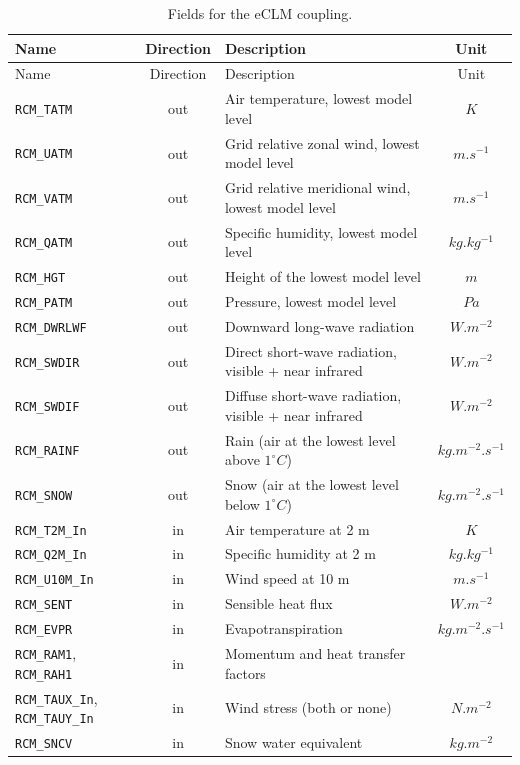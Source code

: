 {\footnotesize
\begin{longtable}{p{4.5cm}|c|p{6.5cm}|c}
\caption{Fields for the eCLM coupling.}
\label{oasis_eclm_field_list}\\
\hline
Name & Direction & Description & Unit\\
\hline
\endfirsthead
\hline
Name & Direction & Description & Unit\\
\hline
\endhead
\verb=RCM_TATM= & out & Air temperature, lowest model level & $K$\\
\verb=RCM_UATM= &
  out &
  Grid relative zonal wind, lowest model level &
  $m.s^{-1}$\\
\verb=RCM_VATM= &
  out &
  Grid relative meridional wind, lowest model level &
  $m.s^{-1}$\\
\verb=RCM_QATM= & out & Specific humidity, lowest model level & $kg.kg^{-1}$\\
\verb=RCM_HGT= & out & Height of the lowest model level & $m$\\
\verb=RCM_PATM= & out & Pressure, lowest model level & $Pa$\\
\verb=RCM_DWRLWF= & out & Downward long-wave radiation & $W.m^{-2}$\\
\verb=RCM_SWDIR= &
  out &
  Direct short-wave radiation, visible + near infrared &
  $W.m^{-2}$\\
\verb=RCM_SWDIF= &
  out &
  Diffuse short-wave radiation, visible + near infrared &
  $W.m^{-2}$\\
\verb=RCM_RAINF= &
  out &
  Rain (air at the lowest level above $1^{\circ}C$) &
  $kg.m^{-2}.s^{-1}$\\
\verb=RCM_SNOW= &
  out &
  Snow (air at the lowest level below $1^{\circ}C$) &
  $kg.m^{-2}.s^{-1}$\\
\verb=RCM_T2M_In= & in & Air temperature at 2 m & $K$\\
\verb=RCM_Q2M_In= & in & Specific humidity at 2 m & $kg.kg^{-1}$\\
\verb=RCM_U10M_In= & in & Wind speed at 10 m & $m.s^{-1}$\\
\verb=RCM_SENT= & in & Sensible heat flux & $W.m^{-2}$\\
\verb=RCM_EVPR= & in & Evapotranspiration & $kg.m^{-2}.s^{-1}$\\
\verb=RCM_RAM1=, \verb=RCM_RAH1= & in & Momentum and heat transfer factors & \\
\verb=RCM_TAUX_In=, \verb=RCM_TAUY_In= &
  in &
  Wind stress (both or none) &
  $N.m^{-2}$\\
\verb=RCM_SNCV= & in & Snow water equivalent & $kg.m^{-2}$\\

\end{longtable}}

